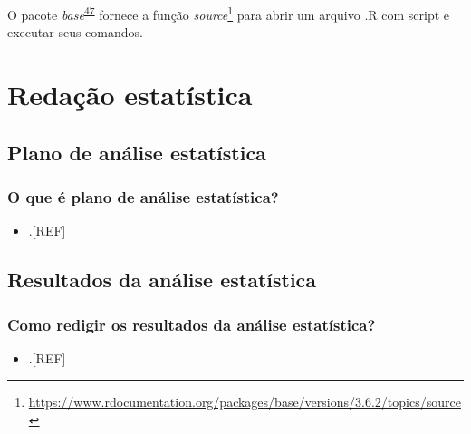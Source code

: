 \documentclass[
  a4paper,
]{book}
\providecommand{\tightlist}{%
  \setlength{\itemsep}{0pt}\setlength{\parskip}{0pt}}
\renewcommand{\href}[2]{#2\footnote{\url{#1}}}
\newenvironment{infobox}[1]
  {
  \begin{itemize}
  \renewcommand{\labelitemi}{
    \raisebox{-.7\height}[0pt][0pt]{
      {\setkeys{Gin}{width=3em,keepaspectratio}
        \texttt{[image: \#1]}}
    }
  }
  \setlength{\fboxsep}{1em}
  \begin{blackbox}
  \item
  }
  {
  \end{blackbox}
  \end{itemize}
  }
\begin{document}
\begin{infobox}{images/Rlogo}
O pacote \emph{base}\textsuperscript{\protect\hyperlink{ref-base-2}{47}} fornece a função \href{https://www.rdocumentation.org/packages/base/versions/3.6.2/topics/source}{\emph{source}} para abrir um arquivo .R com script e executar seus comandos.

\end{infobox}

\hypertarget{redacao}{%
\chapter{\texorpdfstring{\textbf{Redação estatística}}{Redação estatística}}\label{redacao}}

\hypertarget{plano-analise-estatistica}{%
\section{Plano de análise estatística}\label{plano-analise-estatistica}}

\hypertarget{o-que-uxe9-plano-de-anuxe1lise-estatuxedstica}{%
\subsection{O que é plano de análise estatística?}\label{o-que-uxe9-plano-de-anuxe1lise-estatuxedstica}}

\begin{itemize}
\tightlist
\item
  .{[}REF{]}
\end{itemize}

\hypertarget{resultados-analise-estatistica}{%
\section{Resultados da análise estatística}\label{resultados-analise-estatistica}}

\hypertarget{como-redigir-os-resultados-da-anuxe1lise-estatuxedstica}{%
\subsection{Como redigir os resultados da análise estatística?}\label{como-redigir-os-resultados-da-anuxe1lise-estatuxedstica}}

\begin{itemize}
\tightlist
\item
  .{[}REF{]}
\end{itemize}
\end{document}

